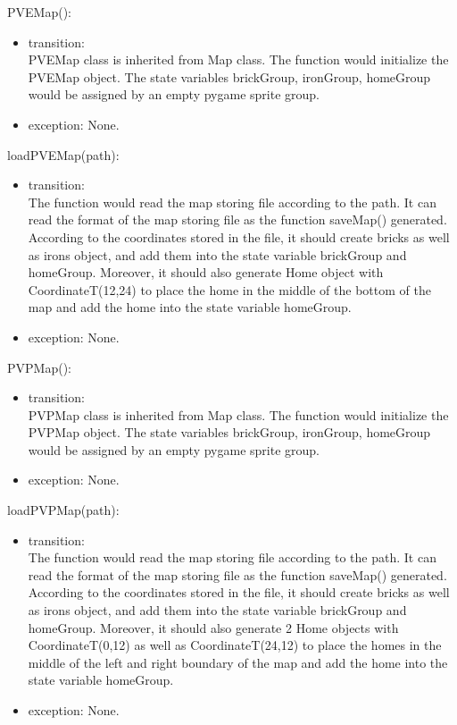 \documentclass[12pt, titlepage]{article}
\begin{document}
        PVEMap():
		\begin{itemize}
		\item transition: \\
		PVEMap class is inherited from Map class. The function would initialize the PVEMap object. The state variables brickGroup, ironGroup, homeGroup would be assigned by an empty pygame sprite group.
		
		\item exception: None.
        \end{itemize}
        loadPVEMap(path):
		\begin{itemize}
		\item transition: \\
		The function would read the map storing file according to the path. It can read the format of the map storing file as the function saveMap() generated. According to the coordinates stored in the file, it should create bricks as well as irons object, and add them into the state variable brickGroup and homeGroup. Moreover, it should also generate Home object with CoordinateT(12,24) to place the home in the middle of the bottom of the map and add the home into the state variable homeGroup.
		
		\item exception: None.
        \end{itemize}
        
        PVPMap():
		\begin{itemize}
		\item transition: \\
		PVPMap class is inherited from Map class. The function would initialize the PVPMap object. The state variables brickGroup, ironGroup, homeGroup would be assigned by an empty pygame sprite group.
		
		\item exception: None.
        \end{itemize}
        
        
        loadPVPMap(path):
		\begin{itemize}
		\item transition: \\
		The function would read the map storing file according to the path. It can read the format of the map storing file as the function saveMap() generated. According to the coordinates stored in the file, it should create bricks as well as irons object, and add them into the state variable brickGroup and homeGroup. Moreover, it should also generate 2 Home objects with CoordinateT(0,12) as well as CoordinateT(24,12) to place the homes in the middle of the left and right boundary of the map and add the home into the state variable homeGroup.
		
		\item exception: None.
        \end{itemize}
        
\end{document}
